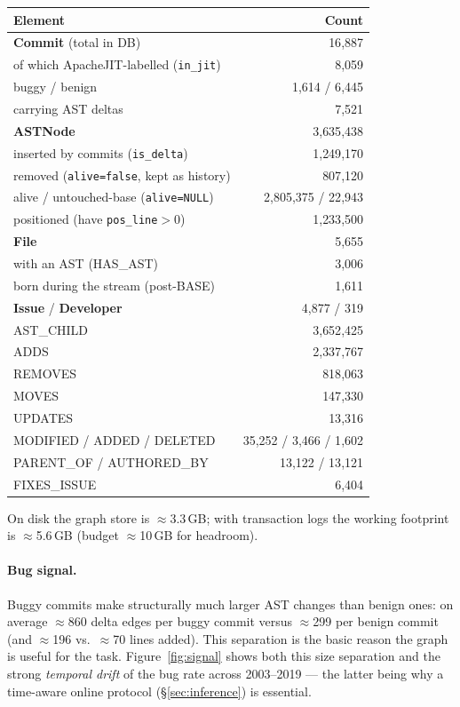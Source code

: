 \documentclass[11pt,a4paper]{article}
\newcommand{\code}[1]{\texttt{#1}}
\newcommand{\node}[1]{\textcolor{kgblue}{\textbf{#1}}}
\newcommand{\edge}[1]{\textsc{#1}}
\begin{document}
	\begin{center}
		\begin{tabular}{@{}lr@{}}
			\toprule
			\textbf{Element} & \textbf{Count}\\
			\midrule
			\node{Commit} (total in DB) & 16{,}887\\
			\quad of which ApacheJIT-labelled (\code{in\_jit}) & 8{,}059\\
			\quad buggy / benign & 1{,}614 / 6{,}445\\
			\quad carrying AST deltas & 7{,}521\\
			\node{ASTNode} & 3{,}635{,}438\\
			\quad inserted by commits (\code{is\_delta}) & 1{,}249{,}170\\
			\quad removed (\code{alive=false}, kept as history) & 807{,}120\\
			\quad alive / untouched-base (\code{alive=NULL}) & 2{,}805{,}375 / 22{,}943\\
			\quad positioned (have \code{pos\_line}$>$0) & 1{,}233{,}500\\
			\node{File} & 5{,}655\\
			\quad with an AST (\edge{HAS\_AST}) & 3{,}006\\
			\quad born during the stream (post-BASE) & 1{,}611\\
			\node{Issue} / \node{Developer} & 4{,}877 / 319\\
			\midrule
			\edge{AST\_CHILD} & 3{,}652{,}425\\
			\edge{ADDS} & 2{,}337{,}767\\
			\edge{REMOVES} & 818{,}063\\
			\edge{MOVES} & 147{,}330\\
			\edge{UPDATES} & 13{,}316\\
			\edge{MODIFIED} / \edge{ADDED} / \edge{DELETED} & 35{,}252 / 3{,}466 / 1{,}602\\
			\edge{PARENT\_OF} / \edge{AUTHORED\_BY} & 13{,}122 / 13{,}121\\
			\edge{FIXES\_ISSUE} & 6{,}404\\
			\bottomrule
		\end{tabular}
	\end{center}
	
	On disk the graph store is $\approx$3.3\,GB; with transaction logs the working
	footprint is $\approx$5.6\,GB (budget $\approx$10\,GB for headroom).
	
	\paragraph{Bug signal.} Buggy commits make structurally much larger AST changes
	than benign ones: on average $\approx$860 delta edges per buggy commit versus
	$\approx$299 per benign commit (and $\approx$196 vs.\ $\approx$70 lines added).
	This separation is the basic reason the graph is useful for the task.
	Figure~\ref{fig:signal} shows both this size separation and the strong
	\emph{temporal drift} of the bug rate across 2003--2019 --- the latter being why
	a time-aware online protocol (\S\ref{sec:inference}) is essential.
	
\end{document}
